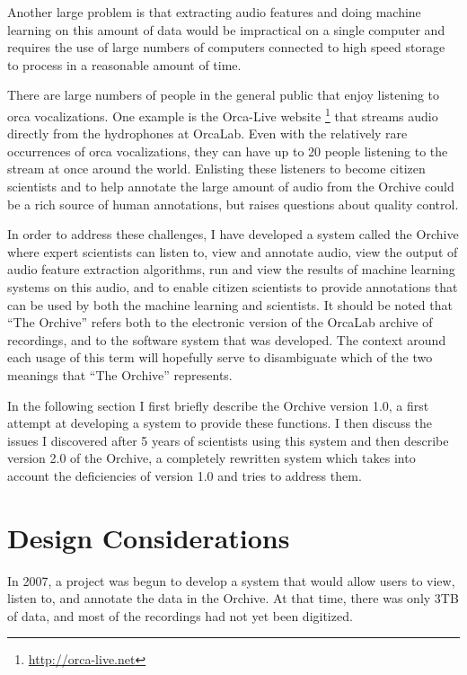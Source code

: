 \documentclass[12pt,oneside]{book}
\begin{document}
Another large problem is that extracting audio features and doing
machine learning on this amount of data would be impractical on a
single computer and requires the use of large numbers of computers
connected to high speed storage to process in a reasonable amount of
time.

There are large numbers of people in the general public that enjoy
listening to orca vocalizations.  One example is the Orca-Live website
\footnote{\url{http://orca-live.net}} that streams audio directly from
the hydrophones at OrcaLab.  Even with the relatively rare occurrences
of orca vocalizations, they can have up to 20 people listening to the
stream at once around the world.  Enlisting these listeners to become
citizen scientists and to help annotate the large amount of audio from
the Orchive could be a rich source of human annotations, but raises
questions about quality control.

In order to address these challenges, I have developed a system
called the Orchive where expert scientists can listen to, view and
annotate audio, view the output of audio feature extraction
algorithms, run and view the results of machine learning systems on
this audio, and to enable citizen scientists to provide annotations
that can be used by both the machine learning and scientists.  It
should be noted that ``The Orchive'' refers both to the electronic
version of the OrcaLab archive of recordings, and to the software
system that was developed.  The context around each usage of this term
will hopefully serve to disambiguate which of the two meanings that
``The Orchive'' represents.

In the following section I first briefly describe the Orchive version
1.0, a first attempt at developing a system to provide these
functions.  I then discuss the issues I discovered after 5 years of
scientists using this system and then describe version 2.0 of the
Orchive, a completely rewritten system which takes into account the
deficiencies of version 1.0 and tries to address them.


\section{Design Considerations}
\label{section:softwareAndSystems:designConsiderations}

In 2007, a project was begun to develop a system that would allow
users to view, listen to, and annotate the data in the Orchive.  At
that time, there was only 3TB of data, and most of the recordings had
not yet been digitized.
\end{document}
